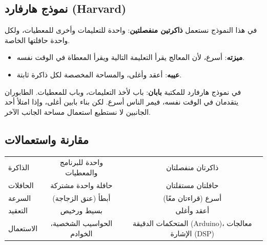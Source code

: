 \subsection{نموذج هارفارد \textenglish{(Harvard)}}

في هذا النموذج نستعمل \textbf{ذاكرتين منفصلتين}: واحدة للتعليمات وأخرى للمعطيات،
ولكل واحدة حافلتها الخاصة.

\begin{center}
\end{center}

\begin{itemize}
    \item \textbf{ميزته}: أسرع، لأن المعالج يقرأ التعليمة التالية ويقرأ المعطاة في الوقت نفسه.
    \item \textbf{عيبه}: أعقد وأغلى، والمساحة المخصصة لكل ذاكرة ثابتة.
\end{itemize}

\begin{tashbih}
    في نموذج هارفارد للمكتبة \textbf{بابان}: باب لأخذ التعليمات، وباب للمعطيات. الطابوران يتقدمان في
    الوقت نفسه، فيمر الناس أسرع. لكن بناء بابين أغلى، وإذا امتلأ أحد الجانبين لا نستطيع استعمال مساحة الجانب الآخر.
\end{tashbih}

\subsection{مقارنة واستعمالات}
\begin{center}
\begin{tabularx}{\linewidth}{|>{\centering\arraybackslash}p{3cm}|C|C|}
    \hline
    \ras{} &  &  \\ \hline
    الذاكرة   & واحدة للبرنامج والمعطيات & ذاكرتان منفصلتان \\ \hline
    الحافلات  & حافلة واحدة مشتركة & حافلتان مستقلتان \\ \hline
    السرعة    & أبطأ (عنق الزجاجة) & أسرع (قراءتان معًا) \\ \hline
    التعقيد   & بسيط ورخيص & أعقد وأغلى \\ \hline
    الاستعمال & الحواسيب الشخصية، الخوادم & المتحكمات الدقيقة (\textenglish{Arduino})، معالجات الإشارة \textenglish{(DSP)} \\ \hline
\end{tabularx}
\end{center}

